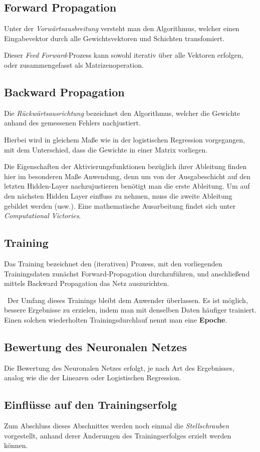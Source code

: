 \subsection{Forward Propagation}
Unter der \textit{Vorwärtsausbreitung} versteht man den Algorithmus, welcher einen Eingabevektor durch alle Gewichtsvektoren und Schichten transfomiert. 

Dieser \textit{Feed Forward}-Prozess kann sowohl iterativ über alle Vektoren erfolgen, oder zusammengefasst als Matrizenoperation.
\subsection{Backward Propagation}
Die \textit{Rückwärtsausrichtung} bezeichnet den Algorithmus, welcher die Gewichte anhand des gemessenen Fehlers nachjustiert. 

Hierbei wird in gleichem Maße wie in der logistischen Regression vorgegangen, mit dem Unterschied, dass die Gewichte in einer Matrix vorliegen. 

Die Eigenschaften der Aktivierungsfunktionen bezüglich ihrer Ableitung finden hier im besonderen Maße Anwendung, denn um von der Ausgabeschicht auf den letzten Hidden-Layer nachzujustieren benötigt man die erste Ableitung. Um auf den nächsten Hidden Layer einfluss zu nehmen, muss die zweite Ableitung gebildet werden (usw.). Eine mathematische Ausarbeitung findet sich unter \cite{colah} \textit{Computational Victories}.
\subsection{Training}
Das Training bezeichnet den (iterativen) Prozess, mit den vorliegenden Trainingsdaten zunächst Forward-Propagation durchzuführen, und anschließend mittels Backward Propagation das Netz auszurichten. 

~\newline Der Umfang dieses Trainings bleibt dem Anwender überlassen. Es ist möglich, bessere Ergebnisse zu erzielen, indem man mit denselben Daten häufiger trainiert. Einen solchen wiederholten Trainingsdurchlauf nennt man eine \textbf{Epoche}. 
\subsection{Bewertung des Neuronalen Netzes}
Die Bewertung des Neuronalen Netzes erfolgt, je nach Art des Ergebnisses, analog wie die der Linearen oder Logistischen Regression. 
\subsection{Einflüsse auf den Trainingserfolg}
Zum Abschluss dieses Abschnittes werden noch einmal die \textit{Stellschrauben} vorgestellt, anhand derer Änderungen des Trainingserfolges erzielt werden können. 

